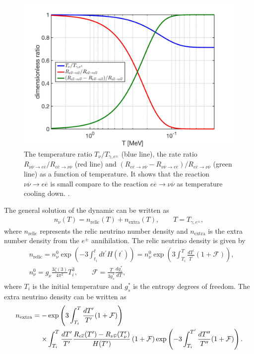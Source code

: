 \begin{figure} 
\begin{center}
\includegraphics[width=0.9\linewidth]{./plots/DimensionlessRatio_ExtraNeutrino}
\caption{The temperature ratio $T_\nu/T_{\gamma,e^\pm}$ (blue line), the rate ratio $R_{\nu\overline{\nu}\rightarrow e\overline{e}}/ R_{e\overline{e}\rightarrow\nu\overline{\nu}}$ (red line) and $(R_{e\overline{e}\rightarrow\nu\overline{\nu}}-R_{\nu\overline{\nu}\rightarrow e\overline{e}})/ R_{e\overline{e}\rightarrow\nu\overline{\nu}}$ (green line) as a function of temperature. It shows that the reaction $\nu\overline{\nu}\rightarrow e\overline{e}$ is small compare to the reaction $e\overline{e}\rightarrow\nu\overline{\nu}$ as temperature cooling down. .}
\label{DimensionlessRatio}
\end{center}
\end{figure}

The general solution of the dynamic  can be written as
\begin{align}
n_\nu(T)=n_\mathrm{relic}(T)+n_\mathrm{extra}(T),\qquad T=T_{\gamma,e^\pm},
\end{align}
where $n_\mathrm{relic}$ represents the relic neutrino number density and $n_\mathrm{extra}$ is the extra number density from the $e^\pm$ annihilation. The relic neutrino density is given by
\begin{align} &n_\mathrm{relic}=n_\nu^0\exp\left(-3\int_{t_i}^t{dt^\prime}H(t^\prime)\right)=n_\nu^0\exp\left(3\int_{T_i}^T\frac{dT^\prime}{T^\prime}(1+\mathcal{F})\right),\\
&n^0_\nu=g_\nu\frac{3\zeta(3)}{4\pi^2}T^3_i,\qquad \mathcal{F}=\frac{T}{3g^\ast_s}\frac{dg^\ast_s}{dT},
\end{align}
where $T_i$ is the initial temperature and $g^\ast_s$ is the entropy degrees of freedom. The extra neutrino density can be written as
\begin{align}
n_\mathrm{extra}=-&\exp\left(3\int_{T_i}^T\frac{dT^\prime}{T^\prime}(1+\mathcal{F})\right)\notag\\
\times&\int_{T_i}^T\frac{dT^\prime}{T^\prime}\frac{R_{e\overline{e}}(T^\prime)-R_{\nu\overline{\nu}}(T^\prime_\nu)}{H(T^\prime)}\left(1+\mathcal{F}\right)\exp\left(-3\int_{T_i}^{T^{\prime}}\frac{dT^{\prime\prime}}{T^{\prime\prime}}(1+\mathcal{F})\right).
\end{align}

